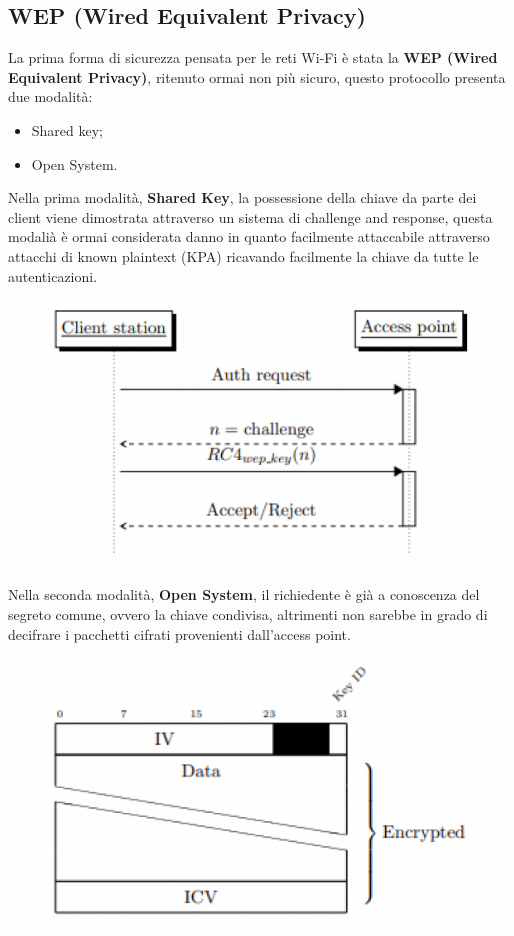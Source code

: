 \subsection{WEP (Wired Equivalent Privacy)}
La prima forma di sicurezza pensata per le reti Wi-Fi è stata la \textbf{WEP (Wired Equivalent Privacy)}, ritenuto ormai non più sicuro, questo protocollo presenta due modalità:
\begin{itemize}
    \item Shared key;
    \item Open System.
\end{itemize}

Nella prima modalità, \textbf{Shared Key}, la possessione della chiave da parte dei client viene dimostrata attraverso un sistema di challenge and response, questa modalià è ormai considerata danno in quanto facilmente attaccabile attraverso attacchi di known plaintext (KPA) ricavando facilmente la chiave da tutte le autenticazioni.

\begin{figure}[h!]
    \centering
    \includegraphics[width=.6\linewidth]{res/WEP_SharedKey.png}
    \caption{}
\end{figure}
\clearpage

Nella seconda modalità, \textbf{Open System}, il richiedente è già a conoscenza del segreto comune, ovvero la chiave condivisa, altrimenti non sarebbe in grado di decifrare i pacchetti cifrati
provenienti dall’access point.

\begin{figure}[h!]
    \centering
    \includegraphics[width=.6\linewidth]{res/WEP_OpenSystem.png}
    \caption{}
\end{figure}

